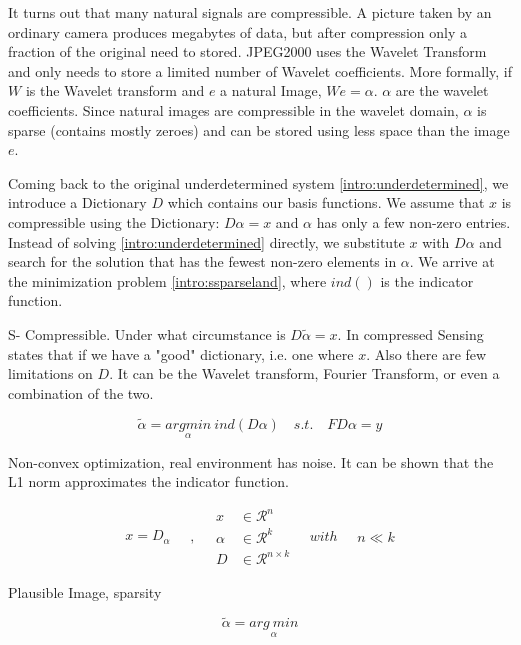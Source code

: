 It turns out that many natural signals are compressible. A picture taken by an ordinary camera produces megabytes of data, but after compression only a fraction of the original need to stored. JPEG2000 uses the Wavelet Transform and only needs to store a limited number of Wavelet coefficients. More formally, if $W$ is the Wavelet transform and $e$ a natural Image, $We = \alpha$. $\alpha$ are the wavelet coefficients. Since natural images are compressible in the wavelet domain, $\alpha$ is sparse (contains mostly zeroes) and can be stored using less space than the image $e$.

Coming back to the original underdetermined system \eqref{intro:underdetermined}, we introduce a Dictionary $D$ which contains our basis functions. We assume that $x$ is compressible using the Dictionary: $D\alpha = x$ and $\alpha$ has only a few non-zero entries. Instead of solving \eqref{intro:underdetermined} directly, we substitute $x$ with $D\alpha$ and search for the solution that has the fewest non-zero elements in $\alpha$. We arrive at the minimization problem \eqref{intro:ssparseland}, where $\mathit{ind}()$ is the indicator function. 

S- Compressible. Under what circumstance is $D\tilde{\alpha} = x$. In compressed Sensing states that if we have a "good" dictionary, i.e. one where $x$. Also there are few limitations on $D$. It can be the Wavelet transform, Fourier Transform, or even a combination of the two.

\begin{equation}\label{intro:ssparseland}
\tilde{\alpha} =  \underset{\alpha}{arg min} \: \mathit{ind}(D\alpha) \quad s. t. \quad FD\alpha = y
\end{equation}

Non-convex optimization, real environment has noise. It can be shown that the L1 norm approximates the indicator function.


\begin{equation}\label{intro:sparseland}
\begin{split}
x  =  D_{\alpha}
\end{split}
\quad , \quad
\begin{split}
x &\in \mathcal{R}^n\\
\alpha &\in \mathcal{R}^k\\
D &\in \mathcal{R}^{n \times k}
\end{split}
\quad with \quad
\begin{split}
n \ll k
\end{split}
\end{equation}

Plausible Image, sparsity

\begin{equation}\label{cs:noiseless}
\tilde{\alpha} =  \underset{\alpha}{arg\: min}
\end{equation}

